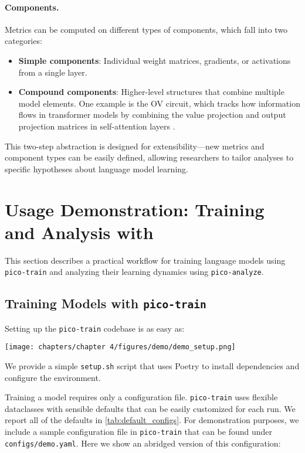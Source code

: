\paragraph{Components.} Metrics can be computed on different types of components, which fall into two categories: 
\begin{itemize} 
\item \textbf{Simple components}: Individual weight matrices, gradients, or activations from a single layer. 
\item \textbf{Compound components}: Higher-level structures that combine multiple model elements. One example is the OV circuit, which tracks how information flows in transformer models by combining the value projection and output projection matrices in self-attention layers \cite{elhage2021mathematical}. 
\end{itemize}

This two-step abstraction is designed for extensibility—new metrics and component types can be easily defined, allowing researchers to tailor analyses to specific hypotheses about language model learning. 


\section{Usage Demonstration: Training and Analysis with \picolarge}

This section describes a practical workflow for training language models using \texttt{pico-train} and analyzing their learning dynamics using \texttt{pico-analyze}.

\subsection{Training Models with \texttt{pico-train}}

Setting up the \texttt{pico-train} codebase is as easy as:

\begin{center}
    \texttt{[image: chapters/chapter 4/figures/demo/demo\_setup.png]}
\end{center}

We provide a simple \verb|setup.sh| script that uses Poetry \citep{poetry} to install dependencies and configure the environment.

Training a model requires only a configuration file. \texttt{pico-train} uses flexible dataclasses with sensible defaults that can be easily customized for each run. We report all of the defaults in \cref{tab:default_configs}. For demonstration purposes, we include a sample configuration file in \texttt{pico-train} that can be found under \verb|configs/demo.yaml|. Here we show an abridged version of this configuration:

